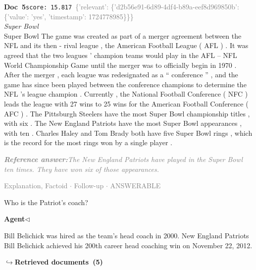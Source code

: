 \documentclass[a4paper,11pt]{article}
\begin{document}
\begin{docenv}
{\footnotesize\textcolor{doccolor}{\textbf{Doc~5}}}\hfill{\tiny\texttt{score:~15.817}}\ {\tiny\textcolor{gray}{\{'relevant': \{'d2b56e91-6d89-4df4-b89a-eef8d969850b': \{'value': 'yes', 'timestamp': 1724778985\}\}\}}}\\[3pt]
{\small\textit{Super Bowl}}\\[2pt]
\vspace{2pt}
{\footnotesize Super Bowl
The game was created as part of a merger agreement between the NFL and its then - rival league , the American Football League ( AFL ) . It was agreed that the two leagues ' champion teams would play in the AFL -- NFL World Championship Game until the merger was to officially begin in 1970 . After the merger , each league was redesignated as a `` conference '' , and the game has since been played between the conference champions to determine the NFL 's league champion . Currently , the National Football Conference ( NFC ) leads the league with 27 wins to 25 wins for the American Football Conference ( AFC ) . The Pittsburgh Steelers have the most Super Bowl championship titles , with six . The New England Patriots have the most Super Bowl appearances , with ten . Charles Haley and Tom Brady both have five Super Bowl rings , which is the record for the most rings won by a single player .}
\end{docenv}
\begin{refanswerenv}
{\footnotesize\textit{\textcolor{gray}{\textbf{Reference answer:}\enspace The New England Patriots have played in the Super Bowl ten times. They have won six of those appearances.}}}
\end{refanswerenv}
\vspace{0.5em}
\hfill{\tiny\textcolor{gray}{Explanation, Factoid $\cdot$ Follow-up $\cdot$ ANSWERABLE}}
\begin{userbubble}
Who is the Patriot's coach?
\end{userbubble}
\noindent\hfill{\small\textcolor{agentcolor}{\textbf{Agent\enspace$\triangleleft$}}}
\begin{agentbubble}
Bill Belichick was hired as the team's head coach in 2000. New England Patriots Bill Belichick achieved his 200th career head coaching win on November 22, 2012.
\end{agentbubble}
\noindent\hfill{\footnotesize\textcolor{doccolor}{\textbf{$\hookrightarrow$\enspace Retrieved documents~(5)}}}
\end{document}
